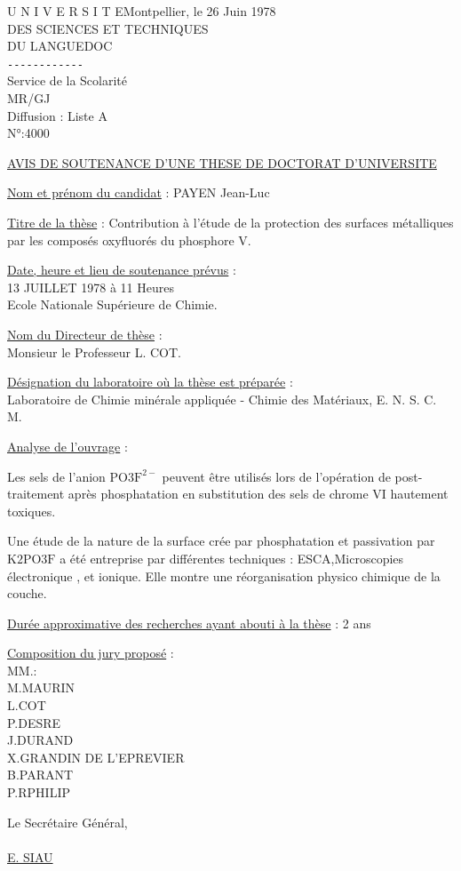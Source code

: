 \noindent U N I V E R S I T E\hfill Montpellier, le 26 Juin 1978\\
DES SCIENCES ET TECHNIQUES\\
DU LANGUEDOC\\
\texttt{-{}-{}-{}-{}-{}-{}-{}-{}-{}-{}-{}-}\\
Service de la Scolarité\\
MR/GJ\\
Diffusion : Liste A\\
N°:4000

\uline{AVIS DE SOUTENANCE D'UNE THESE DE DOCTORAT D'UNIVERSITE}

\uline{Nom et prénom du candidat} : PAYEN Jean-Luc

\uline{Titre de la thèse} : Contribution à l'étude de la protection des surfaces métalliques par les composés oxyfluorés du phosphore V.

\uline{Date, heure et lieu de soutenance prévus} :\\
13 JUILLET 1978 à 11 Heures\\
Ecole Nationale Supérieure de Chimie.

\uline{Nom du Directeur de thèse} :\\
Monsieur le Professeur L. COT.

\uline{Désignation du laboratoire où la thèse est préparée} :\\
Laboratoire de Chimie minérale appliquée - Chimie des Matériaux, \quad E. N. S. C. M.

\uline{Analyse de l'ouvrage} :

Les sels de l'anion $\mathrm{PO3F}^{2-}$ peuvent être utilisés lors de l'opération de post-traitement après phosphatation en substitution des sels de chrome VI hautement toxiques.

Une étude de la nature de la surface crée par phosphatation et passivation par $\mathrm{K2PO3F}$ a été entreprise par différentes techniques : ESCA,Microscopies électronique , et ionique. Elle montre une réorganisation physico chimique de la couche.

\uline{Durée approximative des recherches ayant abouti à la thèse} : 2 ans

\uline{Composition du jury proposé} :\\
MM.\qquad :\\
M.\quad MAURIN\\
L.\quad COT\\
P.\quad DESRE\\
J.\quad DURAND\\
X.\quad GRANDIN DE L'EPREVIER\\
B.\quad PARANT\\
P.R\quad PHILIP

Le Secrétaire Général,\\
\\
\uline{E. SIAU}
